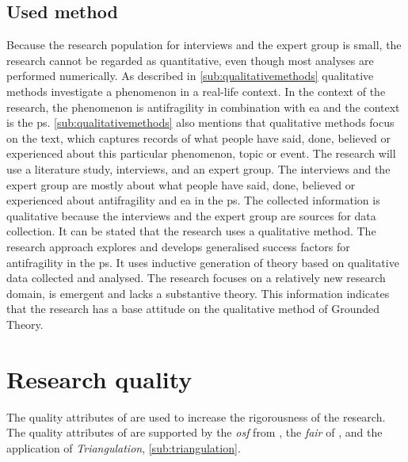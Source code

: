 \subsection{Used method}
\label{sub:usedmethod}
Because the research population for interviews and the expert group is small, the research cannot be regarded as quantitative, even though most analyses are performed numerically. As described in \cref{sub:qualitativemethods} qualitative methods investigate a phenomenon in a real-life context. In the context of the research, the phenomenon is \gls{antifragility} in combination with \acrlong{ea} and the context is the \gls{ps}. \cref{sub:qualitativemethods} also mentions that qualitative methods focus on the text, which captures records of what people have said, done, believed or experienced about this particular phenomenon, topic or event. The research will use a literature study, interviews, and an expert group. The interviews and the expert group are mostly about what people have said, done, believed or experienced about \gls{antifragility} and \acrlong{ea} in the \gls{ps}. The collected information is qualitative because the interviews and the expert group are sources for data collection. It can be stated that the research uses a qualitative method. The research approach explores and develops generalised success factors for \gls{antifragility} in the \gls{ps}. It uses inductive generation of theory based on qualitative data collected and analysed. The research focuses on a relatively new research domain, is emergent and lacks a substantive theory. This information indicates that the research has a base attitude on the qualitative method of Grounded Theory.

\section{Research quality}
\label{sec:researchquality}
The quality attributes of \textcite[p.~15--17]{Recker2013} are used to increase the rigorousness of the research. The quality attributes of \textcite[p.~15--17]{Recker2013} are supported by the \textit{\acrfull{osf}} from \textcite{Foster2017}, the \textit{\gls{fair}} of \textcite[Box 2]{Wilkinson2016}, and the application of \textit{Triangulation}, \cref{sub:triangulation}.

